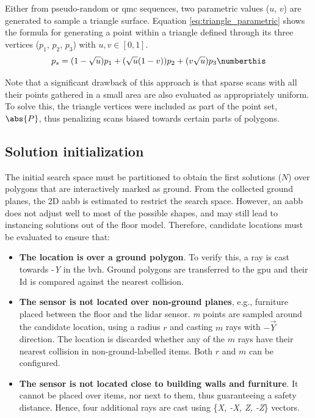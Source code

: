 Either from pseudo-random or \acrshort{qmc} sequences, two parametric values ($u$, $v$) are generated to sample a triangle surface. Equation \ref{eq:triangle_parametric} shows the formula for generating a point within a triangle defined through its three vertices ($p_1$, $p_2$, $p_3$) with $u, v \in [0, 1]$. 
\begin{align*}
    p_{s} = (1 - \sqrt{u}) p_1 + (\sqrt{u} (1 - v)) p_2 + (v \sqrt{u}) p_3
    \numberthis \label{eq:triangle_parametric}
\end{align*}

Note that a significant drawback of this approach is that sparse scans with all their points gathered in a small area are also evaluated as appropriately uniform. To solve this, the triangle vertices were included as part of the point set, $\abs{P}$, thus penalizing scans biased towards certain parts of polygons.

\subsection{Solution initialization}

The initial search space must be partitioned to obtain the first solutions ($N$) over polygons that are interactively marked as ground. From the collected ground planes, the 2D \acrshort{aabb} is estimated to restrict the search space. However, an \acrshort{aabb} does not adjust well to most of the possible shapes, and may still lead to instancing solutions out of the floor model. Therefore, candidate locations must be evaluated to ensure that:
\begin{itemize}
  \item \textbf{The location is over a ground polygon}. To verify this, a ray is cast towards -\textit{Y} in the \acrshort{bvh}. Ground polygons are transferred to the \acrshort{gpu} and their Id is compared against the nearest collision.
  \item \textbf{The sensor is not located over non-ground planes}, e.g., furniture placed between the floor and the \acrshort{lidar} sensor. \textit{m} points are sampled around the candidate location, using a radius $r$ and casting $m$ rays with $-\vec{Y}$ direction. The location is discarded whether any of the $m$ rays have their nearest collision in non-ground-labelled items. Both $r$ and $m$ can be configured.
  \item \textbf{The sensor is not located close to building walls and furniture}. It cannot be placed over items, nor next to them, thus guaranteeing a safety distance. Hence, four additional rays are cast using \{\textit{X, -X, Z, -Z}\} vectors.
\end{itemize}

